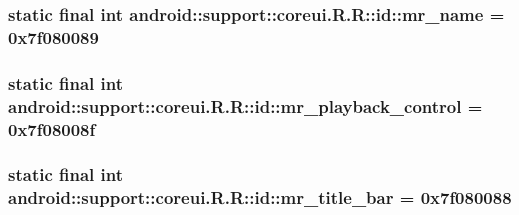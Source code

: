 \hypertarget{classandroid_1_1support_1_1coreui_1_1_r_1_1id_7cdcf5541e119bf58ee7db0e851c37ae}{
\subsubsection[{mr\_\-name}]{\setlength{\rightskip}{0pt plus 5cm}static final int android::support::coreui.R.R::id::mr\_\-name = 0x7f080089}}
\label{classandroid_1_1support_1_1coreui_1_1_r_1_1id_7cdcf5541e119bf58ee7db0e851c37ae}


\hypertarget{classandroid_1_1support_1_1coreui_1_1_r_1_1id_dddbbc856a100cc646afade403563b12}{
\subsubsection[{mr\_\-playback\_\-control}]{\setlength{\rightskip}{0pt plus 5cm}static final int android::support::coreui.R.R::id::mr\_\-playback\_\-control = 0x7f08008f}}
\label{classandroid_1_1support_1_1coreui_1_1_r_1_1id_dddbbc856a100cc646afade403563b12}


\hypertarget{classandroid_1_1support_1_1coreui_1_1_r_1_1id_6c477728da859e277d24d70579c069a0}{
\subsubsection[{mr\_\-title\_\-bar}]{\setlength{\rightskip}{0pt plus 5cm}static final int android::support::coreui.R.R::id::mr\_\-title\_\-bar = 0x7f080088}}
\label{classandroid_1_1support_1_1coreui_1_1_r_1_1id_6c477728da859e277d24d70579c069a0}


